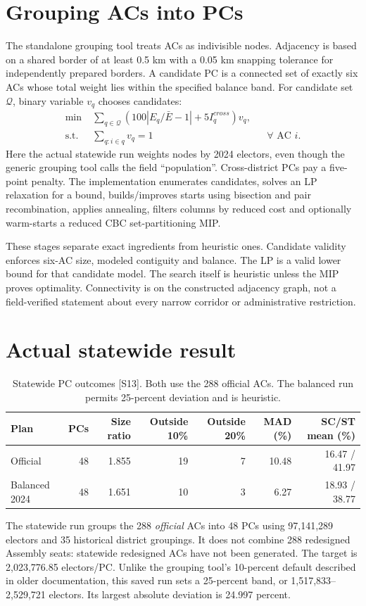 \documentclass[11pt,a4paper,oneside]{report}
\newcommand{\source}[1]{\par\nopagebreak[4]{\footnotesize\color{teal}Evidence: #1.}\par}
\begin{document}
\section{Grouping ACs into PCs}
The standalone grouping tool treats ACs as indivisible nodes. Adjacency is based on a shared border of at least 0.5 km with a 0.05 km snapping tolerance for independently prepared borders. A candidate PC is a connected set of exactly six ACs whose total weight lies within the specified balance band. For candidate set $\mathcal{Q}$, binary variable $v_q$ chooses candidates:
\begin{align}
 \min\;&\sum_{q\in\mathcal Q}\left(100\left|E_q/\bar E-1\right|+5I_q^{cross}\right)v_q,\\
 \text{s.t. }&\sum_{q:i\in q}v_q=1 &&\forall\text{ AC }i.
\end{align}
Here the actual statewide run weights nodes by 2024 electors, even though the generic grouping tool calls the field ``population''. Cross-district PCs pay a five-point penalty. The implementation enumerates candidates, solves an LP relaxation for a bound, builds/improves starts using bisection and pair recombination, applies annealing, filters columns by reduced cost and optionally warm-starts a reduced CBC set-partitioning MIP.

These stages separate exact ingredients from heuristic ones. Candidate validity enforces six-AC size, modeled contiguity and balance. The LP is a valid lower bound for that candidate model. The search itself is heuristic unless the MIP proves optimality. Connectivity is on the constructed adjacency graph, not a field-verified statement about every narrow corridor or administrative restriction.
\source{[S14]}

\section{Actual statewide result}
\begin{table}[htbp]\centering
\small
\setlength{\tabcolsep}{5pt}
\caption{Statewide PC outcomes [S13]. Both use the 288 official ACs. The balanced run permits 25-percent deviation and is heuristic.}
\begin{tabular}{lrrrrrr}
\toprule
Plan & PCs & Size ratio & Outside 10\% & Outside 20\% & MAD (\%) & SC/ST mean (\%)\\
\midrule
Official & 48 & 1.855 & 19 & 7 & 10.48 & 16.47 / 41.97\\
Balanced 2024 & 48 & 1.651 & 10 & 3 & 6.27 & 18.93 / 38.77\\
\bottomrule\end{tabular}
\end{table}
The statewide run groups the 288 \emph{official} ACs into 48 PCs using 97,141,289 electors and 35 historical district groupings. It does not combine 288 redesigned Assembly seats: statewide redesigned ACs have not been generated. The target is 2,023,776.85 electors/PC. Unlike the grouping tool's 10-percent default described in older documentation, this saved run sets a 25-percent band, or 1,517,833--2,529,721 electors. Its largest absolute deviation is 24.997 percent.
\end{document}
